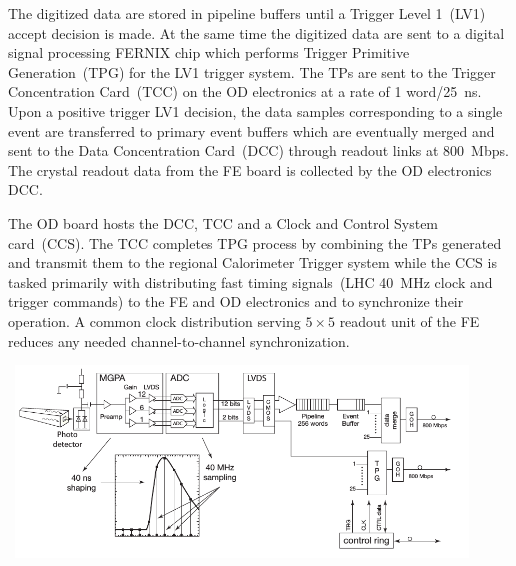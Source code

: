 \newline
The digitized data  are stored in pipeline buffers until a Trigger Level 1~(LV1) accept decision is made. At the same time the digitized data are sent to a digital signal processing FERNIX chip which performs Trigger Primitive Generation~(TPG) for the LV1 trigger system. The TPs are sent to the Trigger Concentration Card~(TCC) on the OD electronics at a rate of 1 word/25~ns.
Upon a positive trigger LV1 decision, the data samples corresponding to a single event are transferred to primary event buffers which are eventually merged and sent to the Data Concentration Card~(DCC) through readout links at 800~Mbps. The crystal readout data from the FE board is collected by the OD electronics DCC.
\par 
  The OD board hosts the DCC, TCC and a Clock and Control System card~(CCS). The TCC completes TPG process by combining the TPs generated and transmit them to the regional Calorimeter Trigger system while the CCS is tasked primarily with distributing fast timing signals~(LHC 40~MHz clock and trigger commands) to the FE and OD electronics and to synchronize their operation. 
A common clock distribution serving $5\times5$ readout unit of the FE reduces any needed channel-to-channel synchronization.

\clearpage
\vspace{5mm}
\begin{minipage}{0.99\textwidth} 
\begin{center}
\mbox{
\includegraphics[height=0.6\textwidth, width=0.9\textwidth]{THESISPLOTS/ReadOut.png}
}
\label{fig:readout1}
\end{center}
\end{minipage}

